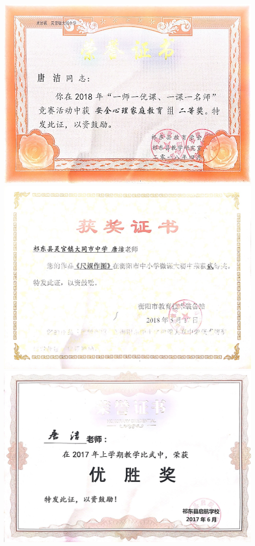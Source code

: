 \documentclass[UFT8]{ctexart}%
\begin{document}
\begin{center}
 \includegraphics[scale=0.37]{figs/2018-04.jpg }
 \includegraphics[scale=0.25]{figs/2018-05.jpg }
 \includegraphics[scale=0.27]{figs/2017-06.jpg }

\end{center}
\end{document}
